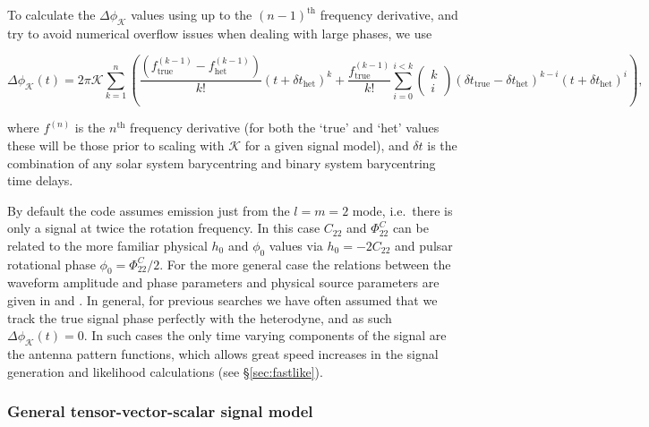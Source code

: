 To calculate the $\Delta\phi_{\mathcal{K}}$ values using up to the $(n-1)^{\text{th}}$ frequency derivative, and try to avoid numerical overflow issues when dealing
with large phases, we use
\begin{widetext}
\begin{equation}\label{eq:deltaphi}
\Delta\phi_{\mathcal{K}}(t) = 2\pi \mathcal{K} \sum_{k=1}^n \left( \frac{\left(f^{(k-1)}_{{\text{true}}} - f^{(k-1)}_{{\text{het}}}\right)}{k!}(t+\delta t_{\text{het}})^k + \frac{f^{(k-1)}_{{\text{true}}}}{k!} 
\sum_{i=0}^{i<k} \left(\begin{array}{c}k \\ i\end{array} \right) (\delta t_{\text{true}}-\delta t_{\text{het}})^{k-i} (t+\delta t_{\text{het}})^i \right),
\end{equation}
\end{widetext}
where $f^{(n)}$ is the $n^{\text{th}}$ frequency derivative (for both the `true' and `het' values these will be those prior to scaling with $\mathcal{K}$ for
a given signal model), and $\delta t$ is the combination of any solar system barycentring and binary system barycentring time delays.

By default the code assumes emission just from the $l=m=2$ mode, i.e.\ there is only a signal at twice the
rotation frequency. In this case $C_{22}$ and $\Phi_{22}^C$ can be related to the more familiar physical
$h_0$ and $\phi_0$ values via $h_0 = -2C_{22}$ \citep[where the minus sign maintains consistency of equation~\ref{eq:h2f} with the form given in][]{1998PhRvD..58f3001J} and pulsar rotational 
phase $\phi_0 = \Phi_{22}^C/2$. For the more general case the
relations between the waveform amplitude and phase parameters and physical source parameters are given in
\citet{2015arXiv150105832J} and \citet{2015MNRAS.453.4399P}. In general, for previous searches we have often assumed that we track the true
signal phase perfectly with the heterodyne, and as such $\Delta\phi_{\mathcal{K}}(t) = 0$. In such cases the only time
varying components of the signal are the antenna pattern functions, which allows great speed increases in the
signal generation and likelihood calculations (see \S\ref{sec:fastlike}).

\subsubsection{General tensor-vector-scalar signal model}

